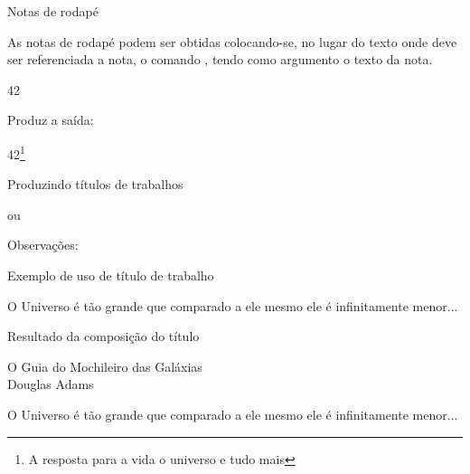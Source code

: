 \begin{frame}{Notas de rodapé}


As notas de rodapé podem ser obtidas colocando-se, no lugar do 
texto onde deve ser referenciada a nota, o comando , tendo como argumento o texto da nota. 

\begin{LaTeXcode}[Exemplo]
42
\end{LaTeXcode}

Produz a saída:
\begin{LaTeXoutput}
42\footnote{A resposta para a vida o universo e tudo mais}
\end{LaTeXoutput}
\end{frame}

\begin{frame}{Produzindo títulos de trabalhos}
\begin{LaTeXcode}[Declarações]
\n
{}\n
{} ou 
\end{LaTeXcode}

Observações:

\begin{LaTeXcode}[Produzindo]
\end{LaTeXcode}
\end{frame}

\begin{frame}{Exemplo de uso de título de trabalho}
\begin{LaTeXcode}
\n
{}\n
{}\n
{}\n
{}\n
{}\n

O Universo é tão grande que comparado a ele mesmo ele é infinitamente menor...
\end{LaTeXcode}
\end{frame}

\begin{frame}{Resultado da composição do título}
\begin{LaTeXoutput}
{\centering
{\Large O Guia do Mochileiro das Galáxias}\\[\baselineskip]
{Douglas Adams}\par}

\vspace{4\baselineskip}

O Universo é tão grande que comparado a ele mesmo ele é infinitamente menor...
\end{LaTeXoutput}
\end{frame}
